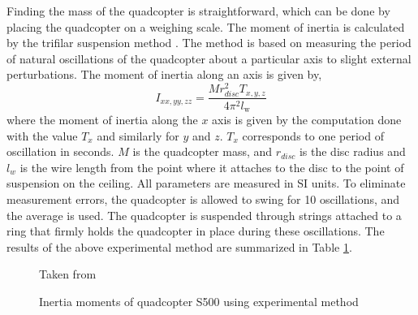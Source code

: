 \documentclass[letterpaper%
, twoside%
, 12pt%
,memoire%
, english%
,creativecommons,hyperref%
]{thETS}
\begin{document}
Finding the mass of the quadcopter is straightforward, which can be done by placing the quadcopter on a weighing scale. The moment of inertia is calculated by the trifilar suspension method \citep{harris2002harris}. The method is based on measuring the period of natural oscillations of the quadcopter about a particular axis to slight external perturbations. The moment of inertia along an axis is given by, 
\begin{equation}\label{ixyz}
I_{xx,yy,zz}=\frac{Mr^2_{disc}T_{x,y,z}}{4\pi^2l_\textrm{w}}
\end{equation}
where the moment of inertia along the $x$ axis is given by the computation done with the value $T_x$ and similarly for $y$ and $z$. $T_x$ corresponds to one period of oscillation in seconds. $M$ is the quadcopter mass, and $r_{disc}$ is the disc radius and $l_w$ is the wire length from the point where it attaches to the disc to the point of suspension on the ceiling. All parameters are measured in SI units. To eliminate measurement errors, the quadcopter is allowed to swing for 10 oscillations, and the average is used. The quadcopter is suspended through strings attached to a ring that firmly holds the quadcopter in place during these oscillations. The results of the above experimental method are summarized in Table \ref{tim}. 


\begin{figure}
	\centering
	\parbox{0.65\textwidth}{
		\begin{center}
		\caption{Inertia moments of quadcopter S500 using experimental method\label{tim}}Taken from \citep{RN121}
		\end{center}	
	}
\end{figure}
\end{document}
